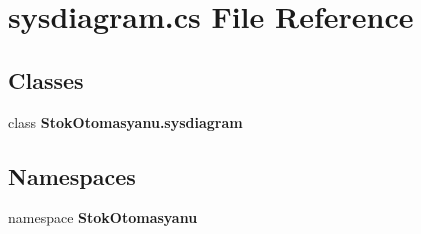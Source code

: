 \section{sysdiagram.\+cs File Reference}
\label{sysdiagram_8cs}
\subsection*{Classes}
\begin{DoxyCompactItemize}
\item 
class \textbf{ Stok\+Otomasyanu.\+sysdiagram}
\end{DoxyCompactItemize}
\subsection*{Namespaces}
\begin{DoxyCompactItemize}
\item 
namespace \textbf{ Stok\+Otomasyanu}
\end{DoxyCompactItemize}
